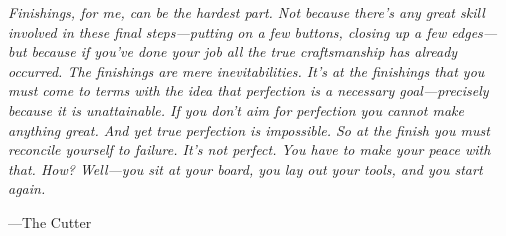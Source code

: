 \cleardoublepage
\thispagestyle{empty}
\afterpage{\blankpage}

\vspace*{\fill}
\begin{adjustwidth}{1in}{1in}
  \textit{Finishings, for me, can be the hardest part.
          Not because there's any great skill involved in these final
          steps---putting on a few buttons, closing up a few edges---but
          because if you've done your job all the true craftsmanship has
          already occurred. The finishings are mere inevitabilities.
          It's at the finishings that you must come to terms with the
          idea that perfection is a necessary goal---precisely because it
          is unattainable. If you don't aim for perfection you cannot make
          anything great. And yet true perfection is impossible.
          So at the finish you must reconcile yourself to failure.
          It's not perfect. You have to make your peace with that.
          How? Well---you sit at your board, you lay out your tools,
          and you start again.}
\end{adjustwidth}
\hspace{10.1cm}---The Cutter
\vspace*{\fill}

\restoregeometry
\doublespace
